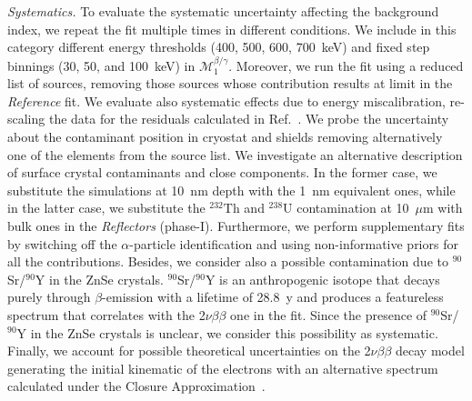 \documentclass[%
reprint,
superscriptaddress,
altaffilletter,
showpacs,
showkeys,
amsmath, amssymb, aps,prl, floatfix,
]{revtex4-1}
\newcommand{\THO}{$^{232}\mathrm{Th}$\xspace}
\newcommand{\UR}{$^{238}\mathrm{U}$\xspace}
\newcommand{\SR}{$^{90}$Sr/$^{90}$Y\xspace}
\newcommand{\vv}{2$\nu\beta\beta$\xspace}
\newcommand{\mspeconeb}{$\mathcal{M}^{\beta/\gamma}_{1}$\xspace}
\newcommand{\phone}{phase-I\xspace}
\begin{document}
{\it Systematics.} To evaluate the systematic uncertainty affecting the background index, we repeat the fit multiple times in different conditions. We include in this category different energy thresholds (400, 500, 600, 700~keV) and fixed step binnings (30, 50, and 100~keV) in \mspeconeb. Moreover, we run the fit using a reduced list of sources, removing those sources whose contribution results at limit in the \textit{Reference} fit. We evaluate also systematic effects due to energy miscalibration, re-scaling the data for the residuals calculated in Ref.~\cite{Azzolini:2018yye}.
We probe the uncertainty about the contaminant position in cryostat and shields removing alternatively one of the elements from the source list. We investigate an alternative description of surface crystal contaminants and close components. In the former case, we substitute the simulations at 10~nm depth with the 1~nm equivalent ones, while in the latter case, we substitute the \THO and \UR contamination at 10~$\mu$m with bulk ones in the {\it Reflectors} (\phone).
Furthermore, we perform supplementary fits by switching off the $\alpha$-particle identification and using non-informative priors for all the contributions. Besides, we consider also a possible contamination due to \SR in the ZnSe crystals.
\SR is an anthropogenic isotope that decays purely through $\beta$-emission with a lifetime of 28.8~y and produces a featureless spectrum that correlates with the \vv one in the fit. Since the presence of \SR in the ZnSe crystals is unclear, we consider this possibility as systematic. Finally, we account for possible theoretical uncertainties on the \vv decay model generating the initial kinematic of the electrons with an alternative spectrum calculated under the Closure Approximation~\cite{Kotila:2012zza}.
\end{document}
